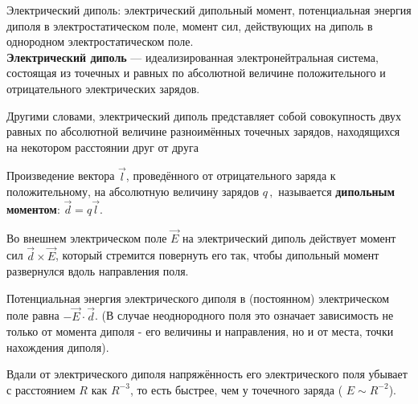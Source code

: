 \documentclass[__minimum__.tex]{subfiles}
\begin{document}

Электрический диполь: электрический дипольный момент, потенциальная энергия диполя в электростатическом поле, момент сил, действующих на диполь в однородном электростатическом поле.\\

\textbf{Электрический диполь} — идеализированная электронейтральная система, состоящая из точечных и равных по абсолютной величине положительного и отрицательного электрических зарядов.

Другими словами, электрический диполь представляет собой совокупность двух равных по абсолютной величине разноимённых точечных зарядов, находящихся на некотором расстоянии друг от друга

Произведение вектора $ \vec l$, проведённого от отрицательного заряда к положительному, на абсолютную величину зарядов $ q\,,$ называется \textbf{дипольным моментом}: $\vec d=q\vec l$.

Во внешнем электрическом поле $\vec E$ на электрический диполь действует момент сил ${\vec d}\times{\vec E}$, который стремится повернуть его так, чтобы дипольный момент развернулся вдоль направления поля.

Потенциальная энергия электрического диполя в (постоянном) электрическом поле равна $-{\vec E}\cdot{\vec d}$. (В случае неоднородного поля это означает зависимость не только от момента диполя - его величины и направления, но и от места, точки нахождения диполя).

Вдали от электрического диполя напряжённость его электрического поля убывает с расстоянием $R$ как $R^{-3}$, то есть быстрее, чем у точечного заряда ( $E \sim R^{-2}$).
\end{document}
